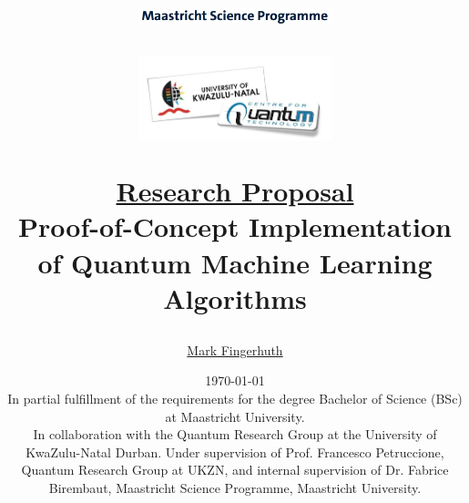 \documentclass[a4paper]{article}
\newcommand*{\0}{$\ket{0}$}
\newcommand*{\1}{$\ket{1}$}
\begin{document}
\title{
\vspace{0.5cm}
\begin{figure}[!ht]
\centering
\includegraphics[width=0.5\textwidth]{MSC2.png}
\end{figure}
\vspace{0.3cm}
\begin{figure}[!ht]
\centering
\includegraphics[width=0.5\textwidth]{logo.jpeg}
\end{figure}
\vspace{1.6cm}
\Huge{ \underline{Research Proposal} \\ \vspace{1cm} \bf Proof-of-Concept Implementation of Quantum Machine Learning Algorithms \\ \vspace{1cm}}}
\author{\Large \href{mailto:m.fingerhuth@student.maastrichtuniversity.nl}{Mark Fingerhuth}
}
\date{
\today \\
\vspace{1.0cm}
\footnotesize{
In partial fulfillment of the requirements for the degree Bachelor of Science (BSc) at Maastricht University. \\}
\vspace{3.5cm}
\normalsize
In collaboration with the Quantum Research Group at the University of KwaZulu-Natal Durban. Under supervision of Prof. Francesco Petruccione, Quantum Research Group at UKZN, and internal supervision of Dr. Fabrice Birembaut, Maastricht Science Programme, Maastricht University.
}
\maketitle
\setlength{\parindent}{0pt}

\end{document}
